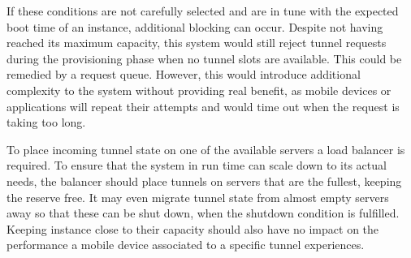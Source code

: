 If these conditions are not carefully selected and are in tune with the expected boot time of an instance, additional blocking can occur.
Despite not having reached its maximum capacity, this system would still reject tunnel requests during the provisioning phase when no tunnel slots are available.
This could be remedied by a request queue.
However, this would introduce additional complexity to the system without providing real benefit, as mobile devices or applications will repeat their attempts and would time out when the request is taking too long. 

To place incoming tunnel state on one of the available servers a load balancer is required. 
To ensure that the system in run time can scale down to its actual needs, the balancer should place tunnels on servers that are the fullest, keeping the reserve free.
It may even migrate tunnel state from almost empty servers away so that these can be shut down, when the shutdown condition is fulfilled.
Keeping instance close to their capacity should also have no impact on the performance a mobile device associated to a specific tunnel experiences.
